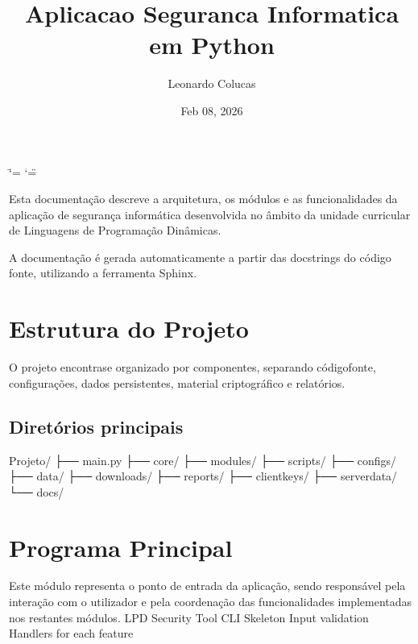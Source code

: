 \documentclass[letterpaper,10pt,english]{sphinxmanual}
\title{Aplicacao Seguranca Informatica em Python}
\date{Feb 08, 2026}
\author{Leonardo Colucas}
\begin{document}
\ifdefined\shorthandoff
  \ifnum\catcode`\=\string=\active\shorthandoff{=}\fi
  \ifnum\catcode`\"=\active{}\fi
\fi

\pagestyle{empty}
\sphinxmaketitle
\pagestyle{plain}
\sphinxtableofcontents
\pagestyle{normal}
\label{\detokenize{index::doc}}


\sphinxAtStartPar
Esta documentação descreve a arquitetura, os módulos e as funcionalidades
da aplicação de segurança informática desenvolvida no âmbito da unidade
curricular de Linguagens de Programação Dinâmicas.

\sphinxAtStartPar
A documentação é gerada automaticamente a partir das docstrings do código
fonte, utilizando a ferramenta Sphinx.

\sphinxstepscope


\chapter{Estrutura do Projeto}
\label{\detokenize{structure:estrutura-do-projeto}}\label{\detokenize{structure::doc}}
\sphinxAtStartPar
O projeto encontra\sphinxhyphen{}se organizado por componentes, separando código\sphinxhyphen{}fonte,
configurações, dados persistentes, material criptográfico e relatórios.


\section{Diretórios principais}
\label{\detokenize{structure:diretorios-principais}}
\begin{sphinxVerbatim}[commandchars=\\\{\}]
Projeto/
├── main.py
├── core/
├── modules/
├── scripts/
├── configs/
├── data/
├── downloads/
├── reports/
├── client\PYGZus{}keys/
├── server\PYGZus{}data/
└── docs/
\end{sphinxVerbatim}

\sphinxstepscope


\chapter{Programa Principal}
\label{\detokenize{main:programa-principal}}\label{\detokenize{main::doc}}
\sphinxAtStartPar
Este módulo representa o ponto de entrada da aplicação, sendo responsável
pela interação com o utilizador e pela coordenação das funcionalidades
implementadas nos restantes módulos.
\label{\detokenize{main:module-main}}
\sphinxAtStartPar
LPD Security Tool \sphinxhyphen{} CLI Skeleton
\sphinxhyphen{} Input validation
\sphinxhyphen{} Handlers for each feature
\end{document}
